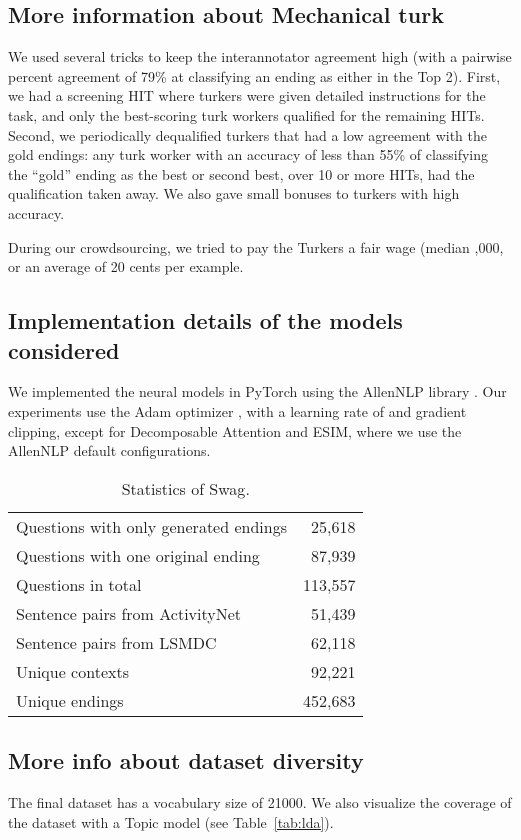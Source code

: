 \documentclass[11pt,a4paper]{article}
\newcommand\customfont[1]{{\usefont{T1}{perm}{m}{n}#1}}
\newcommand{\datasetname}{{\small\customfont{Swag}}}
\begin{document}
\subsection{More information about Mechanical turk}
We used several tricks to keep the interannotator agreement high (with a pairwise percent agreement of 79\% at classifying an ending as either in the Top 2). First, we had a screening HIT where turkers were given detailed instructions for the task, and only the best-scoring turk workers qualified for the remaining HITs. Second, we periodically dequalified turkers that had a low agreement with the gold endings: any turk worker with an accuracy of less than 55\% of classifying the ``gold'' ending as the best or second best, over 10 or more HITs, had the qualification taken away. We also gave small bonuses to turkers with high accuracy. 

During our crowdsourcing, we tried to pay the Turkers a fair wage (median ,000, or an average of 20 cents per example.

\subsection{Implementation details of the models considered}\label{appendix:Implementation}
We implemented the neural models in PyTorch using the AllenNLP library \cite{gardner2018allennlp}. Our experiments use the Adam optimizer \cite{Kingma2014AdamAM}, with a learning rate of  and gradient clipping, except for Decomposable Attention and ESIM, where we use the AllenNLP default configurations. 

\begin{table}[t!]
\centering
\begin{tabular}{@{}l r @{}}
\toprule
Questions with only generated endings & 25,618 \\
Questions with one original ending & 87,939 \\
Questions in total & 113,557 \\
Sentence pairs from ActivityNet & 51,439 \\
Sentence pairs from LSMDC & 62,118 \\
Unique contexts & 92,221 \\
Unique endings & 452,683 \\
\bottomrule
\end{tabular}
\caption{Statistics of \datasetname.}
\label{tab:datastats}
\end{table}

\subsection{More info about dataset diversity}
The final dataset has a vocabulary size of 21000. We also visualize the coverage of the dataset with a Topic model (see Table~\ref{tab:lda}).
\end{document}
